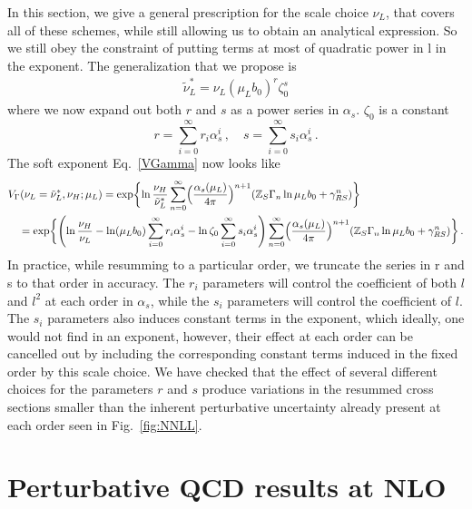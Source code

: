 \documentclass[a4,letterpaper,11pt]{article}
\newcommand{\nn}{\nonumber}
\newcommand{\be}{\begin{equation}}
\newcommand{\ee}{\end{equation}}
\newcommand{\bea}{\begin{eqnarray}}
\newcommand{\eea}{\end{eqnarray}}
\newcommand{\as}{\alpha_s}
\newcommand{\zed}{\mathbb{Z}}
\newcommand{\eq}[1]{Eq.~\eqref{#1}}
\newcommand{\fig}[1]{Fig.~\ref{fig:#1}}
\begin{document}
In this section, we give a general prescription for the scale choice $\nu_L$, that covers all of these schemes, while still allowing us to obtain an analytical expression. So we still obey the constraint of putting terms at most of quadratic power in l in the exponent. The generalization that we propose is 
\bea
 \tilde \nu_L^*= \nu_L(\mu_L b_0)^{r}\zeta_0^{s}
\eea
where we now expand out both $r$ and $s$ as a power series in $\alpha_s$. $\zeta_0$ is a constant
\be
r = \sum_{i=0}^{\infty} r_i \alpha_s^i\,,\quad  s = \sum_{i=0}^{\infty} s_i \alpha_s^i\,.
\ee
The soft exponent \eq{VGamma} now looks like 
\begin{align}
&V_\Gamma (\nu_L = \tilde \nu_L^*,\nu_H;\mu_L) = \exp\biggl\{ \ln\frac{\nu_H}{ \tilde \nu_L^*} \sum_{n=0}^\infty \Bigl(\frac{\as(\mu_L)}{4\pi}\Bigr)^{n+1}(\zed_S \Gamma_n \ln\mu_L b_0 + \gamma_{RS}^n)\biggr\}\,\\
&\quad=  \exp\biggl\{ \left(\ln\frac{\nu_H}{\nu_L}- \ln(\mu_L b_0) \sum_{i=0}^{\infty} r_i \alpha_s^i -\ln \zeta_0  \sum_{i=0}^{\infty} s_i \alpha_s^i \right) \sum_{n=0}^\infty \Bigl(\frac{\as(\mu_L)}{4\pi}\Bigr)^{n+1}(\zed_S \Gamma_n \ln\mu_L b_0 + \gamma_{RS}^n)\biggr\}\,. \nn
\end{align}
In practice, while resumming to a particular order, we truncate the series in r and s to that order in accuracy. The $r_i$ parameters will control the coefficient of both $l$ and $l^2$ at each order in $\alpha_s$, while the $s_i$ parameters will control the coefficient of $l$. The $s_i$ parameters also induces constant terms in the exponent, which ideally, one would not find in an exponent, however, their effect at each order can be cancelled out by including the corresponding constant terms induced in the fixed order by this scale choice.  We have checked that the effect of several different choices for the parameters $r$ and $s$ produce variations in the resummed cross sections smaller than the inherent perturbative uncertainty already present at each order seen in \fig{NNLL}.



\section{Perturbative QCD results at NLO}\label{app:per}
\end{document}
